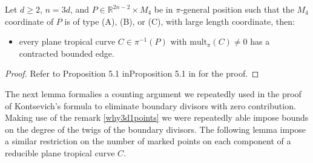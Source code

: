 \begin{lemma}
    \label{redCond}
    Let $d \geq 2$, $n=3d$, and $P \in \mathbb{R}^{2n-2}\times M_{4}$ be in $\pi$-general position such that the $M_{4}$ coordinate of $P$ is of type (A), (B), or (C), with large length coordinate, then:
    \begin{itemize}
        \item every plane tropical curve $C \in \pi^{-1}(P)$ with $\text{mult}_{\pi}(C) \neq 0$ has a contracted bounded edge.
    \end{itemize}
\end{lemma}
\begin{proof}
    Refer to Proposition 5.1 inProposition 5.1 in  \cite{GATHMANNwdvv} for the proof.
\end{proof}

The next lemma formalies a counting argument we repeatedly used in the proof of Kontsevich's formula to eliminate boundary divisors with zero contribution.
Making use of the remark \ref{why3d1points} we were repeatedly able impose bounds on the degree of the twigs of the boundary divisors.
The following lemma impose a similar restriction on the number of marked points on each component of a reducible plane tropical curve $C$.

